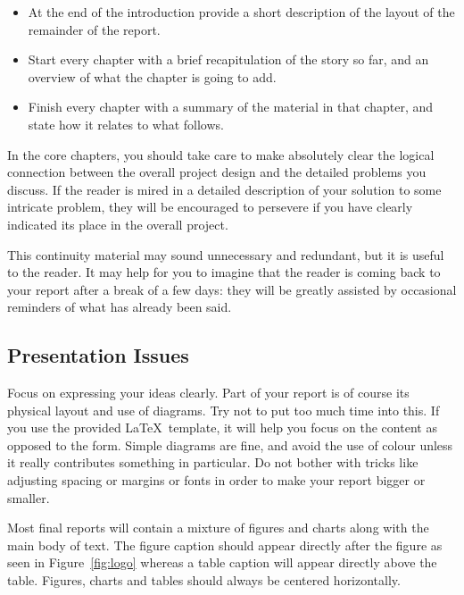 \documentclass[]{final_report}
\begin{document}
\begin{itemize}
\item At the end of the introduction provide a short description of the layout of
the remainder of the report.
\item Start every chapter with a brief recapitulation of the story so far, and an
overview of what the chapter is going to add.
\item Finish every chapter with a summary of the material in that chapter, and
state how it relates to what follows.
\end{itemize}

In the core chapters, you should take care to make absolutely clear the logical connection between the overall project design and the detailed problems you discuss. If the reader is mired in a detailed description of your solution to some intricate problem, they will be encouraged to persevere if you have clearly indicated its place in the overall project.

This continuity material may sound unnecessary and redundant, but it is useful to the reader. It may help for you to imagine that the reader is coming back to your report after a break of a few days: they will be greatly assisted by occasional reminders of what has already been said.

\subsection{Presentation Issues}

Focus on expressing your ideas clearly. Part of your report is of course its physical layout and use of diagrams. Try not to put too much time into this. If you use the provided \LaTeX\ template, it will help you focus on the content as opposed to the form. Simple diagrams are fine, and avoid the use of colour unless it really contributes something in particular. Do not bother with tricks like adjusting spacing or margins or fonts in order to make your report bigger or smaller.

Most final reports will contain a mixture of figures and charts along with the main body of text. The figure caption should appear directly after the figure as seen in Figure~\ref{fig:logo} whereas a table caption will appear directly above the table. Figures, charts and tables should always be centered horizontally. 
\end{document}
